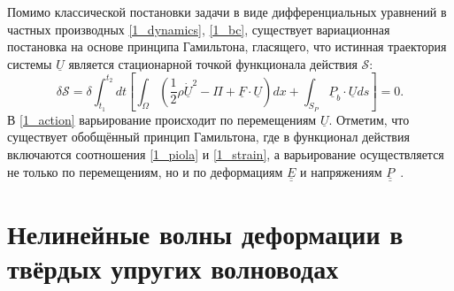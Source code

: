 \documentclass[12pt, a4paper]{report}
\newcommand{\lb}{\left (}
\newcommand{\rb}{\right )}
\newcommand{\lsq}{\left [}
\newcommand{\rsq}{\right ]}
\newcommand{\vect}[1]{\underline{#1}}
\newcommand{\tens}[1]{\underline{\underline{#1}}}
\begin{document}
Помимо классической постановки задачи в виде дифференциальных уравнений в частных производных \eqref{1_dynamics}, \eqref{1_bc}, существует вариационная постановка на основе принципа Гамильтона, гласящего, что истинная траектория системы $\vect{U}$ является стационарной точкой функционала действия $\mathcal{S}$:
\begin{equation}\label{1_action}
\delta\mathcal{S} = \delta\int_{t_1}^{t_2} dt \lsq \int_{\Omega} \lb \frac12\rho\dot{\vect{U}}^2 - \Pi + \vect{F}\cdot\vect{U} \rb dx + \int_{S_P} \vect{P}_b\cdot\vect{U} ds \rsq = 0.
\end{equation}
В \eqref{1_action} варьирование происходит по перемещениям $\vect{U}$. Отметим, что существует обобщённый принцип Гамильтона, где в функционал действия включаются соотношения \eqref{1_piola} и \eqref{1_strain}, а варьирование осуществляется не только по перемещениям, но и по деформациям $\tens{E}$ и напряжениям $\tens{P}$~\cite{Yu}.



\section{Нелинейные волны деформации в твёрдых упругих волноводах}
\end{document}
